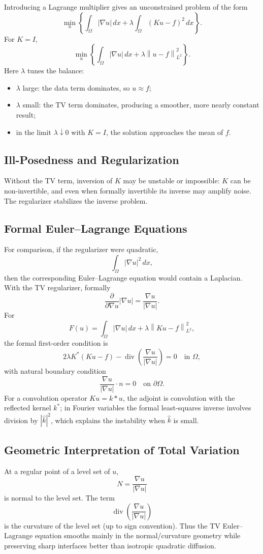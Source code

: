 \documentclass[11pt]{article}
\newcommand{\Om}{\Omega}
\newcommand{\Div}{\operatorname{div}}
\newcommand{\norm}[2][]{\left\lVert #2\right\rVert_{#1}}
\theoremstyle{definition}
\theoremstyle{plain}
\begin{document}
Introducing a Lagrange multiplier gives an unconstrained problem of the form
\[
\min_u\left\{
\int_{\Om}|\nabla u|\,dx
+\lambda\int_{\Om}(Ku-f)^2\,dx
\right\}.
\]
For $K=I$,
\[
\min_u\left\{
\int_{\Om}|\nabla u|\,dx
+\lambda\norm[L^2]{u-f}^2
\right\}.
\]
Here $\lambda$ tunes the balance:
\begin{itemize}
\item $\lambda$ large: the data term dominates, so $u\approx f$;
\item $\lambda$ small: the TV term dominates, producing a smoother, more nearly constant result;
\item in the limit $\lambda\downarrow0$ with $K=I$, the solution approaches the mean of $f$.
\end{itemize}

\subsection{Ill-Posedness and Regularization}
Without the TV term, inversion of $K$ may be unstable or impossible: $K$ can be non-invertible, and even when formally invertible its inverse may amplify noise. The regularizer stabilizes the inverse problem.

\subsection{Formal Euler--Lagrange Equations}
For comparison, if the regularizer were quadratic,
\[
\int_{\Om}|\nabla u|^2\,dx,
\]
then the corresponding Euler--Lagrange equation would contain a Laplacian. With the TV regularizer, formally
\[
\frac{\partial}{\partial \nabla u}|\nabla u|
=\frac{\nabla u}{|\nabla u|}.
\]
For
\[
F(u)=\int_{\Om}|\nabla u|\,dx
+\lambda\norm[L^2]{Ku-f}^2,
\]
the formal first-order condition is
\[
2\lambda K^*(Ku-f)
-\Div\left(\frac{\nabla u}{|\nabla u|}\right)=0
\quad\text{in }\Om,
\]
with natural boundary condition
\[
\frac{\nabla u}{|\nabla u|}\cdot n=0
\quad\text{on }\partial\Om.
\]
For a convolution operator $Ku=k*u$, the adjoint is convolution with the reflected kernel $k^*$; in Fourier variables the formal least-squares inverse involves division by $|\widehat{k}|^2$, which explains the instability when $\widehat{k}$ is small.

\subsection{Geometric Interpretation of Total Variation}
At a regular point of a level set of $u$,
\[
N=\frac{\nabla u}{|\nabla u|}
\]
is normal to the level set. The term
\[
\Div\left(\frac{\nabla u}{|\nabla u|}\right)
\]
is the curvature of the level set (up to sign convention). Thus the TV Euler--Lagrange equation smooths mainly in the normal/curvature geometry while preserving sharp interfaces better than isotropic quadratic diffusion.
\end{document}
